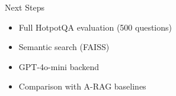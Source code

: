 \documentclass[final]{beamer}
\newlength{\sep}\setlength{\sep}{24pt}
\newlength{\colwidth}\setlength{\colwidth}{0.28\textwidth}
\begin{document}
\begin{frame}[t]
\begin{columns}[t]
\begin{column}{\colwidth}
\vspace{\sep}

\begin{block}{Next Steps}
\begin{itemize}
    \item Full HotpotQA evaluation (500 questions)
    \item Semantic search (FAISS)
    \item GPT-4o-mini backend
    \item Comparison with A-RAG baselines
\end{itemize}
\end{block}
\end{column}

\end{columns}

\end{frame}
\end{document}
